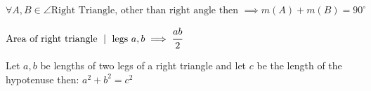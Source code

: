 \begin{theorem}
$\forall A, B \in \angle \text{Right Triangle, other than right angle then } \implies m(A) + m(B) = 90^{\circ}$
\end{theorem}
\begin{theorem}
$\text{Area of right triangle } \mid \text{ legs } a, b \implies \cfrac{ab}{2}$
\end{theorem}
\begin{theorem}
Let $a, b$ be lengths of two legs of a right triangle and let $c$ be the length of the hypotenuse then:
$a^2 + b^2 = c^2$
\end{theorem}
